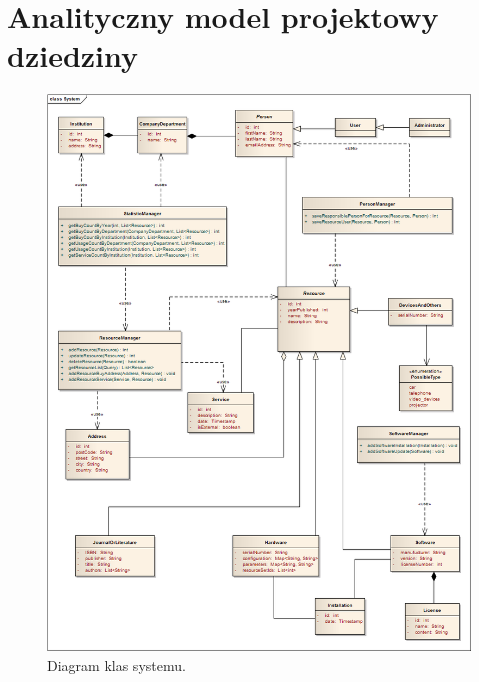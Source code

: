 \section{Analityczny model projektowy dziedziny}
\begin{figure}[h!]
	\centering
	\includegraphics[scale=0.4]{img/class-diagram2}
	\caption{Diagram klas systemu.\label{fig:labelClassDiagram}}
\end{figure}

\newpage 


